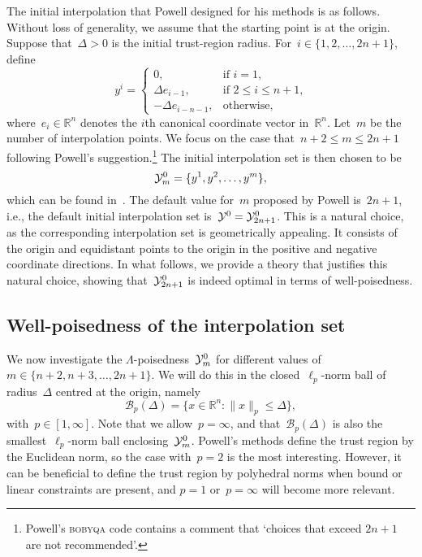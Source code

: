 \documentclass{article}
\numberwithin{equation}{section}
\theoremstyle{definition}
\theoremstyle{plain}
\theoremstyle{remark}
\newcommand*{\norm}[2][]{#1\lVert#2#1\rVert}
\newcommand*{\R}{\mathbb{R}}
\newcommand*{\set}[2][]{#1\{#2#1\}}
\newcommand*{\solvername}[1]{\textsc{#1}\xspace}
\newcommand*{\xpt}[1][]{\mathcal{Y}\ifblank{#1}{}{^{#1}}}
\begin{document}
The initial interpolation that Powell designed for his methods is as follows.
Without loss of generality, we assume that the starting point is at the origin.
Suppose that~$\Delta > 0$ is the initial trust-region radius.
For~$i \in \set{1, 2, \dots, 2n + 1}$, define
\begin{equation}
    \label{eq:set-def}
    y^i =
    \begin{cases}
        0,                      & \text{if~$i = 1$,}\\
        \Delta e_{i - 1},       & \text{if~$2 \le i \le n + 1$,}\\
        -\Delta e_{i - n - 1},  & \text{otherwise},
    \end{cases}
\end{equation}
where~$e_i \in \R^n$ denotes the $i$th canonical coordinate vector in~$\R^n$.
Let~$m$ be the number of interpolation points. We focus on the case that~$n+2 \le m \le 2n+1$
following Powell's suggestion.\footnote{
Powell's \solvername{bobyqa} code contains a comment that `choices that exceed $2n+1$ are not recommended'.
}
The initial interpolation set is then chosen to be
\begin{equation}
    \label{eq:set-def-m}
    \xpt[0]_m = \set{y^1, y^2, \dots, y^m},
\end{equation}
which can be found in~\cite[eq.~(3.2)]{Powell_2006}.
The default value for~$m$ proposed by Powell is~$2n + 1$, i.e., the default initial interpolation
set is~$\xpt[0] = \xpt[0]_{2n + 1}$.
This is a natural choice, as the corresponding interpolation set is geometrically appealing.
It consists of the origin and equidistant points to the origin in the positive and negative coordinate directions.
In what follows, we provide a theory that justifies this natural choice, showing that~$\xpt[0]_{2n + 1}$
is indeed optimal in terms of well-poisedness.

\subsection{Well-poisedness of the interpolation set}

We now investigate the $\Lambda$-poisedness~$\xpt[0]_m$ for different values of~$m \in \{n+2, n+3, \dots, 2n+1\}$.
We will do this in the closed~$\ell_p$-norm ball of radius~$\Delta$ centred at the origin, namely
\begin{equation*}
    \mathcal{B}_p(\Delta) = \set{x \in \R^n : \norm{x}_p \le \Delta},
\end{equation*}
with~$p \in [1, \infty]$.
Note that we allow~$p = \infty$, and that~$\mathcal{B}_p(\Delta)$ is also the smallest~$\ell_p$-norm ball enclosing~$\xpt[0]_m$.
Powell's methods define the trust region by the Euclidean norm, so the case with~$p=2$ is the most
interesting. However, it can be beneficial to define the trust region by polyhedral norms when bound
or linear constraints are present, and $p=1$ or~$p=\infty$ will become more relevant.
\end{document}
